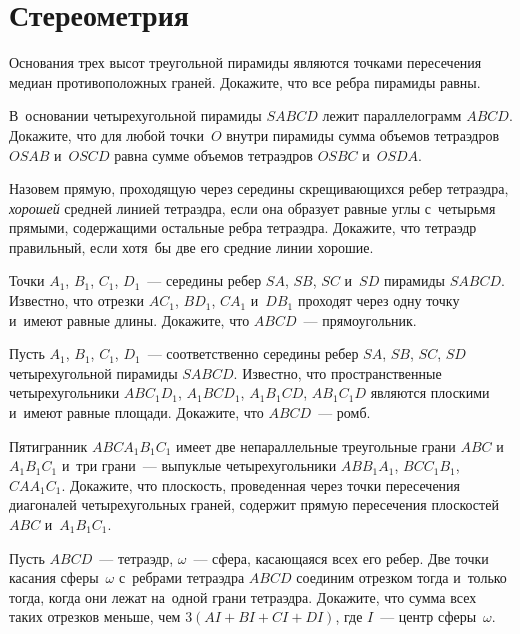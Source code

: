 
\section*{Стереометрия}


\begin{problems}

\item
Основания трех высот треугольной пирамиды являются точками пересечения медиан
противоположных граней.
Докажите, что все ребра пирамиды равны.

\item
В~основании четырехугольной пирамиды $SABCD$ лежит параллелограмм $ABCD$.
Докажите, что для любой точки~$O$ внутри пирамиды сумма объемов тетраэдров
$OSAB$ и~$OSCD$ равна сумме объемов тетраэдров $OSBC$ и~$OSDA$.

\item
Назовем прямую, проходящую через середины скрещивающихся ребер тетраэдра,
\emph{хорошей} средней линией тетраэдра, если она образует равные углы
с~четырьмя прямыми, содержащими остальные ребра тетраэдра.
Докажите, что тетраэдр правильный, если хотя~бы две его средние линии хорошие.

\item
Точки $A_1$, $B_1$, $C_1$, $D_1$~--- середины ребер $SA$, $SB$, $SC$ и~$SD$
пирамиды $SABCD$.
Известно, что отрезки $AC_1$, $BD_1$, $CA_1$ и~$DB_1$ проходят через одну точку
и~имеют равные длины.
Докажите, что $ABCD$~--- прямоугольник.

\item
Пусть $A_1$, $B_1$, $C_1$, $D_1$~--- соответственно середины ребер $SA$, $SB$,
$SC$, $SD$ четырехугольной пирамиды $SABCD$.
Известно, что пространственные четырехугольники $A B C_1 D_1$, $A_1 B C D_1$,
$A_1 B_1 C D$, $A B_1 C_1 D$ являются плоскими и~имеют равные площади.
Докажите, что $ABCD$~--- ромб.

\item
Пятигранник $A B C A_1 B_1 C_1$ имеет две непараллельные треугольные
грани $ABC$ и~$A_1 B_1 C_1$ и~три грани~--- выпуклые четырехугольники
$A B B_1 A_1$, $B C C_1 B_1$, $C A A_1 C_1$.
Докажите, что плоскость, проведенная через точки пересечения диагоналей
четырехугольных граней, содержит прямую пересечения плоскостей $ABC$
и~$A_1 B_1 C_1$.

\item
Пусть $ABCD$~--- тетраэдр, $\omega$~--- сфера, касающаяся всех его ребер.
Две точки касания сферы~$\omega$ с~ребрами тетраэдра $ABCD$ соединим отрезком
тогда и~только тогда, когда они лежат на~одной грани тетраэдра.
Докажите, что сумма всех таких отрезков меньше, чем $3 (AI + BI + CI + DI)$,
где $I$~--- центр сферы~$\omega$.

\end{problems}

